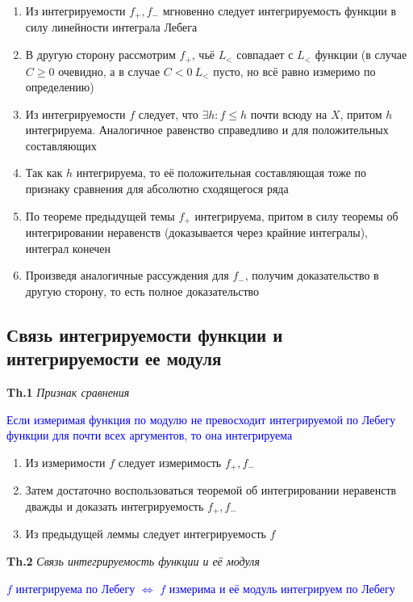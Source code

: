 \begin{enumerate}
    \item Из интегрируемости $f_+, f_-$ мгновенно следует интегрируемость функции в силу линейности интеграла Лебега
    \item В другую сторону рассмотрим $f_+$, чьё $L_<$ совпадает с $L_<$ функции (в случае $C \geq 0$ очевидно, а в
    случае $C < 0~L_<$ пусто, но всё равно измеримо по определению)
    \item Из интегрируемости $f$ следует, что $\exists h: f \leq h$ почти всюду на $X$, притом $h$ интегрируема.
    Аналогичное
    равенство
    справедливо и для положительных составляющих
    \item Так как $h$ интегрируема, то её положительная составляющая тоже по признаку сравнения для абсолютно
    сходящегося ряда
    \item По теореме предыдущей темы $f_+$ интегрируема, притом в силу теоремы об интегрировании неравенств
    (доказывается через крайние интегралы), интеграл конечен
    \item Произведя аналогичные рассуждения для $f_-$, получим доказательство в другую сторону, то есть полное
    доказательство
\end{enumerate}

\subsection{Связь интегрируемости функции и интегрируемости ее модуля}

\textbf{Th.1} \textit{Признак сравнения}

\textcolor{blue}{Если измеримая функция по модулю не превосходит интегрируемой по Лебегу функции для почти всех
аргументов, то она интегрируема}

\begin{enumerate}
    \item Из измеримости $f$ следует измеримость $f_+, f_-$
    \item Затем достаточно воспользоваться теоремой об интегрировании неравенств дважды и доказать
    интегрируемость $f_+, f_-$
    \item Из предыдущей леммы следует интегрируемость $f$
\end{enumerate}

\textbf{Th.2} \textit{Связь интегрируемость функции и её модуля}

\textcolor{blue}{$f$ интегрируема по Лебегу $\Leftrightarrow$ $f$ измерима и её модуль интегрируем по Лебегу} \\

